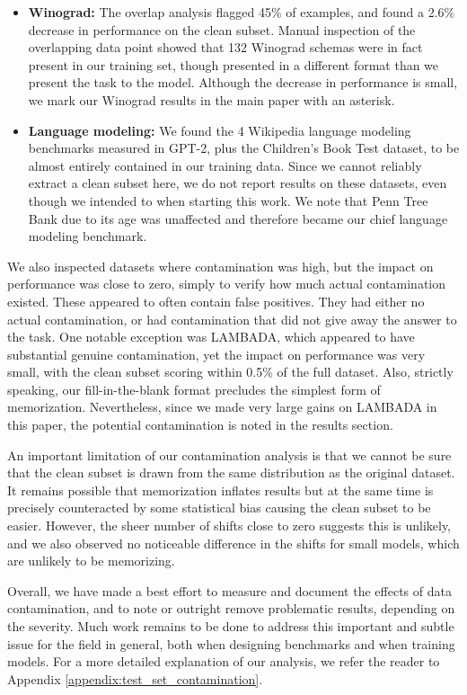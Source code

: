 \begin{itemize}
    \item \textbf{Winograd:} The overlap analysis flagged 45\% of examples, and found a 2.6\% decrease in performance on the clean subset. Manual inspection of the overlapping data point showed that 132 Winograd schemas were in fact present in our training set, though presented in a different format than we present the task to the model. Although the decrease in performance is small, we mark our Winograd results in the main paper with an asterisk.
    \item \textbf{Language modeling:} We found the 4 Wikipedia language modeling benchmarks measured in GPT-2, plus the Children's Book Test dataset, to be almost entirely contained in our training data.  Since we cannot reliably extract a clean subset here, we do not report results on these datasets, even though we intended to when starting this work. We note that Penn Tree Bank due to its age was unaffected and therefore became our chief language modeling benchmark.
\end{itemize}

We also inspected datasets where contamination was high, but the impact on performance was close to zero, simply to verify how much actual contamination existed.  These appeared to often contain false positives. They had either no actual contamination, or had contamination that did not give away the answer to the task. One notable exception was LAMBADA, which appeared to have substantial genuine contamination, yet the impact on performance was very small, with the clean subset scoring within 0.5\% of the full dataset.  Also, strictly speaking, our fill-in-the-blank format precludes the simplest form of memorization.  Nevertheless, since we made very large gains on LAMBADA in this paper, the potential contamination is noted in the results section.

An important limitation of our contamination analysis is that we cannot be sure that the clean subset is drawn from the same distribution as the original dataset.  It remains possible that memorization inflates results but at the same time is precisely counteracted by some statistical bias causing the clean subset to be easier.  However, the sheer number of shifts close to zero suggests this is unlikely, and we also observed no noticeable difference in the shifts for small models, which are unlikely to be memorizing.

Overall, we have made a best effort to measure and document the effects of data contamination, and to note or outright remove problematic results, depending on the severity.  Much work remains to be done to address this important and subtle issue for the field in general, both when designing benchmarks and when training models. For a more detailed explanation of our analysis, we refer the reader to Appendix \ref{appendix:test_set_contamination}.
